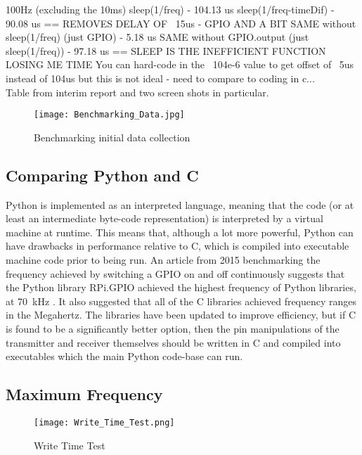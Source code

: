 \documentclass[../main.tex]{subfiles}
\begin{document}
100Hz (excluding the 10ms)
sleep(1/freq) - 104.13 us
sleep(1/freq-timeDif) - 90.08 us == REMOVES DELAY OF ~15us - GPIO AND A BIT
SAME without sleep(1/freq) (just GPIO) - 5.18 us
SAME without GPIO.output (just sleep(1/freq)) - 97.18 us == SLEEP IS THE INEFFICIENT FUNCTION LOSING ME TIME
You can hard-code in the ~104e-6 value to get offset of ~5us instead of 104us but this is not ideal - need to compare to coding in c...\\

Table from interim report and two screen shots in particular.\\

\begin{figure}[ht]
	\centering
	\texttt{[image: Benchmarking\_Data.jpg]}
	\caption{Benchmarking initial data collection}
\end{figure}

\subsection{Comparing Python and C} \label{sec_Comparing Python and C}

Python is implemented as an interpreted language, meaning that the code (or at least an intermediate byte-code representation) is interpreted by a virtual machine at runtime.
This means that, although a lot more powerful, Python can have drawbacks in performance relative to C, which is compiled into executable machine code prior to being run.
An article from 2015 benchmarking the frequency achieved by switching a GPIO on and off continuously suggests that the Python library RPi.GPIO achieved the highest frequency of Python libraries, at \SI{70}{\kilo\hertz} \cite{web_BenchmarkingPi}.
It also suggested that all of the C libraries achieved frequency ranges in the Megahertz.
The libraries have been updated to improve efficiency, but if C is found to be a significantly better option, then the pin manipulations of the transmitter and receiver themselves should be written in C and compiled into executables which the main Python code-base can run.

\subsection{Maximum Frequency}

\begin{figure}[ht]
	\centering
	\texttt{[image: Write\_Time\_Test.png]}
	\caption{Write Time Test}
\end{figure}
\end{document}
